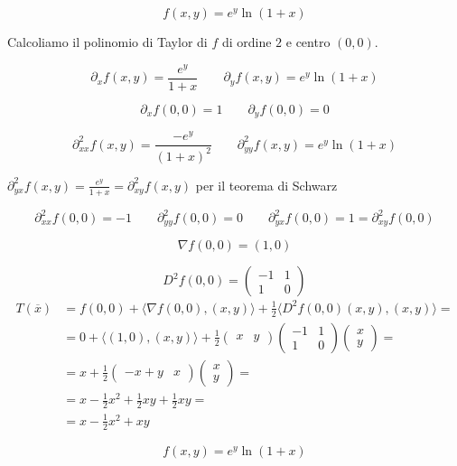 \begin{exbar}
\begin{example}
	$$f(x,y)=e^y\ln(1+x)$$
	
	Calcoliamo il polinomio di Taylor di $f$ di ordine $2$ e centro $(0,0)$.
	
	$$\partial_xf(x,y)=\frac{e^y}{1+x} \qquad \partial_y f(x,y) =e^y \ln(1+x)$$
	
	$$\partial_xf(0,0)=1 \qquad \partial_y f(0,0)=0$$
	
	$$\partial_{xx}^2f(x,y)=\frac{-e^y}{(1+x)^2} \qquad \partial_{yy}^2f(x,y)=e^y\ln(1+x)$$
	
	{\centering $\partial_{yx}^2 f(x,y)=\frac{e^y}{1+x}=\partial_{xy}^2f(x,y)$ per il teorema di Schwarz \par}
	
	$$\partial_{xx}^2f(0,0)=-1 \qquad \partial_{yy}^2f(0,0)=0 \qquad \partial_{yx}^2f(0,0)=1=\partial_{xy}^2f(0,0)$$
	
	$$\nabla f(0,0)=(1,0)$$
	
	$$D^2f(0,0)=
	\begin{pmatrix}
		-1&1
		\\
		1&0
	\end{pmatrix}$$
	\begin{align*} 
		T(\overline{x})&=f(0,0)+\langle\nabla f(0,0),(x,y) \rangle + \frac{1}{2}\langle D^2f(0,0)(x,y),(x,y) \rangle=
		\\
		&=0+\langle (1,0),(x,y) \rangle + \frac{1}{2}
		\begin{pmatrix}
			x&y
		\end{pmatrix}\begin{pmatrix}
			-1& 1\\
			1 &0
		\end{pmatrix} \begin{pmatrix}
			x\\
			y
		\end{pmatrix}=
		\\
		&=x+\frac{1}{2}
		\begin{pmatrix}
			-x+y & x
		\end{pmatrix}\begin{pmatrix}
			x\\
			y
		\end{pmatrix}=
		\\
		&=x-\frac{1}{2}x^2+\frac{1}{2}xy+\frac{1}{2}xy=
		\\
		&=x-\frac{1}{2}x^2+xy
	\end{align*}
	
	$$f(x,y)=e^y\ln(1+x)$$
	

\end{example}
\end{exbar}

